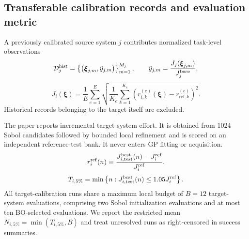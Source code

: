 \documentclass{l4dc2026}
\newcommand{\calD}{\mathcal{D}}
\begin{document}
\subsection{Transferable calibration records and evaluation metric}
A previously calibrated source system $j$ contributes normalized task-level observations
\begin{equation}
 \calD_j^{\rm hist}
 =\left\{\left(\boldsymbol{\xi}_{j,m},\tilde y_{j,m}\right)\right\}_{m=1}^{M_j},
 \qquad
 \tilde y_{j,m}=\frac{J_j(\boldsymbol{\xi}_{j,m})}{J_j^{\rm base}},
 \label{eq:historical_data}
\end{equation}
 {\color{MGpurple}
\begin{equation} 
    J_i(\boldsymbol{\xi})=\frac{1}{E}\sum_{e=1}^{E}\sqrt{\frac{1}{K_e}\sum_{k=1}^{K_e}\left(r_{i,k}^{(e)}(\boldsymbol{\xi})-r_{\mathrm{ref},k}^{(e)}\right)^2}. 
\label{eq:tracking_cost}
\end{equation}}
%
  Historical records belonging to the target itself are excluded.

The paper reports incremental target-system effort.  It is obtained from 1024 Sobol candidates followed by bounded local refinement and is scored on an independent reference-test bank. It never enters GP fitting or acquisition.  {\color{MGpurple}\begin{equation} r_i^{\mathrm{ref}}(n)=\frac{J_{i,\mathrm{test}}^{\mathrm{best}}(n)-J_i^{\rm ref}}{J_i^{\rm ref}}. \label{eq:reference_regret}\end{equation}} 
\begin{equation}
 T_{i,5\%}
 =\min\left\{n:J_{i,\mathrm{test}}^{\mathrm{best}}(n)\le1.05J_i^{\rm ref}\right\}.
 \label{eq:n5}
\end{equation}
All target-calibration runs share a maximum local budget of $B=12$ target-system evaluations, comprising two Sobol initialization evaluations and at most ten BO-selected evaluations. We report the restricted mean $N_{i,5\%}=\min(T_{i,5\%},B)$ and treat unresolved runs as right-censored in success summaries.
\end{document}
